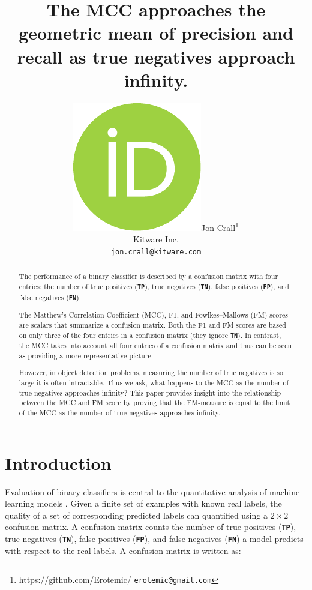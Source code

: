 \documentclass{article}
\title{
    The MCC approaches the geometric mean of precision and recall as true negatives approach infinity.
}
\author{\href{https://orcid.org/0009-0008-8455-7514}{\includegraphics[scale=0.06]{orcid.pdf}\hspace{1mm}Jon Crall}\thanks{https://github.com/Erotemic/ \texttt{erotemic@gmail.com}} \\
	Kitware Inc.\\
	\texttt{jon.crall@kitware.com}
}
\newcommand{\TP}[1]{\textcolor{kwgreen}{\texttt{\textbf{TP}}}}
\newcommand{\FP}[1]{\textcolor{kwred}{\texttt{\textbf{FP}}}}
\newcommand{\TN}[1]{\textcolor{kwblue}{\texttt{\textbf{TN}}}}
\newcommand{\FN}[1]{\textcolor{kworange}{\texttt{\textbf{FN}}}}
\newcommand{\MCC}[0]{\texttt{\textbf{MCC}}}
\newcommand{\Fowlkes}[0]{\texttt{\textbf{FM}}}
\begin{document}
\maketitle

\begin{abstract}

    The performance of a binary classifier is described by a confusion matrix with four entries:
    the number of true positives (\TP{}), true negatives (\TN{}), false positives (\FP{}), and false
      negatives (\FN{}).

    The Matthew's Correlation Coefficient (MCC), F1, and Fowlkes--Mallows (FM) scores are scalars that
      summarize a confusion matrix.
    Both the F1 and FM scores are based on only three of the four entries in a confusion matrix (they
      ignore \TN{}).
    In contrast, the MCC takes into account all four entries of a confusion matrix and thus can be seen as
      providing a more representative picture.

    However, in object detection problems, measuring the number of true negatives is so large it is often
      intractable.
    Thus we ask, what happens to the MCC as the number of true negatives approaches infinity?
    This paper provides insight into the relationship between the MCC and FM score by proving that the
      FM-measure is equal to the limit of the MCC as the number of true negatives approaches infinity.

\end{abstract}




\section{Introduction}

Evaluation of binary classifiers is central to the quantitative analysis of
machine learning models \cite{powers_evaluation_2011}.
Given a finite set of examples with known real labels, the quality of a set of
corresponding predicted labels can quantified using a $2 \times 2$ confusion
matrix.  A confusion matrix counts the number of true positives (\TP{}), true
negatives (\TN{}), false positives (\FP{}), and false negatives (\FN{}) a model
predicts with respect to the real labels. A confusion matrix is written as:
\end{document}
